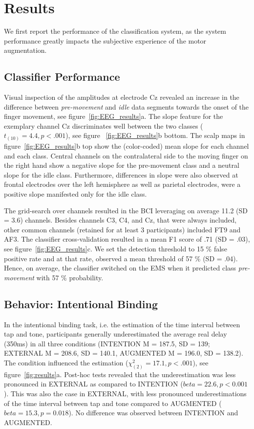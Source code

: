 \section{Results}
We first report the performance of the classification system, as the system performance greatly impacts the subjective experience of the motor augmentation.

\subsection{Classifier Performance}
Visual inspection of the amplitudes at electrode Cz revealed an increase in the difference between \textit{pre-movement} and \textit{idle} data segments towards the onset of the finger movement, see figure~\ref{fig:EEG_results}a. The slope feature for the exemplary channel Cz discriminates well between the two classes (${t_{(10)}} = 4.4, p < .001$), see figure ~\ref{fig:EEG_results}b bottom. The scalp maps in figure~\ref{fig:EEG_results}b top show the (color-coded) mean slope for each channel and each class. Central channels on the contralateral side to the moving finger on the right hand show a negative slope for the pre-movement class and a neutral slope for the idle class. Furthermore, differences in slope were also observed at frontal electrodes over the left hemisphere as well as parietal electrodes, were a positive slope manifested only for the idle class. 

The grid-search over channels resulted in the BCI leveraging on average 11.2 (SD = 3.6) channels. Besides channels C3, C4, and Cz, that were always included, other common channels (retained for at least 3 participants) included FT9 and AF3. The classifier cross-validation resulted in a mean F1 score of .71 (SD = .03), see figure~\ref{fig:EEG_results}c. We set the detection threshold to 15 \% false positive rate and at that rate, observed a mean threshold of 57 \% (SD = .04). Hence, on average, the classifier switched on the EMS when it predicted class \textit{pre-movement} with 57 \% probability.

\subsection{Behavior: Intentional Binding}
In the intentional binding task, i.e. the estimation of the time interval between tap and tone, participants generally underestimated the average real delay (350ms) in all three conditions (INTENTION M = 187.5, SD = 139; EXTERNAL M = 208.6, SD = 140.1, AUGMENTED M = 196.0, SD = 138.2). The condition influenced the estimation (${\chi^{2}_{(2)}} = 17.1, p < .001$), see figure~\ref{fig:results}a. Post-hoc tests revealed that the underestimation was less pronounced in EXTERNAL as compared to INTENTION ($beta = 22.6, p < 0.001$). This was also the case in EXTERNAL, with less pronounced underestimations of the time interval between tap and tone compared to AUGMENTED ($beta = 15.3, p = 0.018$). No difference was observed between INTENTION and AUGMENTED.

